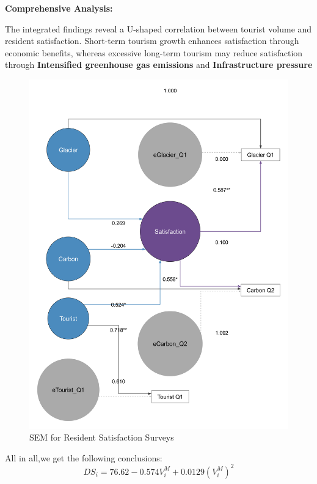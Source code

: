 \documentclass{mcmthesis}
\begin{document}
\textbf{Comprehensive Analysis:}\par
The integrated findings reveal a U-shaped correlation between tourist volume and resident satisfaction. Short-term tourism growth enhances satisfaction through economic benefits, whereas excessive long-term tourism may reduce satisfaction through \textbf{Intensified greenhouse gas emissions} and \textbf{Infrastructure pressure} \par
\begin{figure}[h!] 
  \centering
  \includegraphics[width=12cm]{sem_diagram_final.pdf}
  \caption{SEM for Resident Satisfaction Surveys} \label{fig:sem}
\end{figure}
All in all,we get the following conclusions:
\begin{equation}
  DS_i = 76.62 - 0.574 V_i^M + 0.0129 \left( V_i^M \right)^2
\end{equation}
\end{document}
